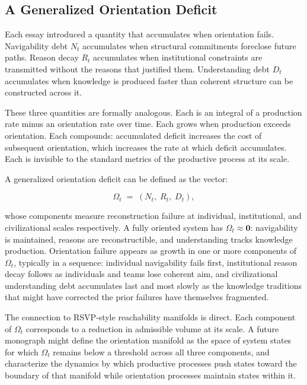 \subsection*{A Generalized Orientation Deficit}

Each essay introduced a quantity that accumulates when orientation fails.
Navigability debt $N_t$ accumulates when structural commitments foreclose
future paths. Reason decay $R_t$ accumulates when institutional constraints
are transmitted without the reasons that justified them. Understanding debt
$D_t$ accumulates when knowledge is produced faster than coherent structure
can be constructed across it.

These three quantities are formally analogous. Each is an integral of a
production rate minus an orientation rate over time. Each grows when production
exceeds orientation. Each compounds: accumulated deficit increases the cost
of subsequent orientation, which increases the rate at which deficit accumulates.
Each is invisible to the standard metrics of the productive process at its
scale.

A generalized orientation deficit can be defined as the vector:

\[
\Omega_t \;=\; (N_t,\; R_t,\; D_t),
\]

whose components measure reconstruction failure at individual, institutional,
and civilizational scales respectively. A fully oriented system has
$\Omega_t \approx \mathbf{0}$: navigability is maintained, reasons are
reconstructible, and understanding tracks knowledge production. Orientation
failure appears as growth in one or more components of $\Omega_t$, typically
in a sequence: individual navigability fails first, institutional reason
decay follows as individuals and teams lose coherent aim, and civilizational
understanding debt accumulates last and most slowly as the knowledge traditions
that might have corrected the prior failures have themselves fragmented.

The connection to RSVP-style reachability manifolds is direct. Each component
of $\Omega_t$ corresponds to a reduction in admissible volume at its scale.
A future monograph might define the orientation manifold as the space of
system states for which $\Omega_t$ remains below a threshold across all
three components, and characterize the dynamics by which productive processes
push states toward the boundary of that manifold while orientation processes
maintain states within it.


